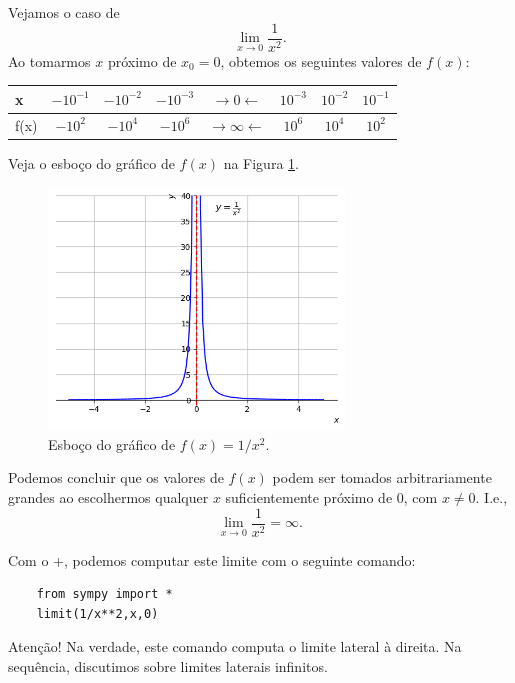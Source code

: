 \begin{ex}
  Vejamos o caso de
  \begin{equation}
    \lim_{x\to 0} \frac{1}{x^2}.
  \end{equation}
  Ao tomarmos $x$ próximo de $x_0=0$, obtemos os seguintes valores de $f(x)$:
  \begin{center}
    \begin{tabular}[H]{l|ccc|c|ccc}
      x & $-10^{-1}$ & $-10^{-2}$ & $-10^{-3}$ & $\rightarrow 0 \leftarrow$ & $10^{-3}$ & $10^{-2}$ & $10^{-1}$ \\\hline
      f(x) & $-10^{2}$ & $-10^{4}$ & $-10^{6}$ & $\rightarrow \infty \leftarrow$ & $10^{6}$ & $10^{4}$ & $10^{2}$
    \end{tabular}
  \end{center}
  Veja o esboço do gráfico de $f(x)$ na Figura \ref{fig:ex_liminf_1x2}.

\begin{figure}[H]
  \centering
  \includegraphics[width=0.7\textwidth]{./cap_lim/dados/fig_ex_liminf_1x2/fig_ex_liminf_1x2}
  \caption{Esboço do gráfico de $f(x)=1/x^2$.}
  \label{fig:ex_liminf_1x2}
\end{figure}  

  Podemos concluir que os valores de $f(x)$ podem ser tomados arbitrariamente grandes ao escolhermos qualquer $x$ suficientemente próximo de $0$, com $x\neq 0$. I.e.,
  \begin{equation}
    \lim_{x\to 0}\frac{1}{x^2} = \infty.
  \end{equation}

  \ifispython
  Com o {\python}+{\sympy}, podemos computar este limite com o seguinte comando:
  \begin{lstlisting}
    from sympy import *
    limit(1/x**2,x,0)
  \end{lstlisting}
  Atenção! Na verdade, este comando computa o limite lateral à direita. Na sequência, discutimos sobre limites laterais infinitos.
  \fi
\end{ex}

